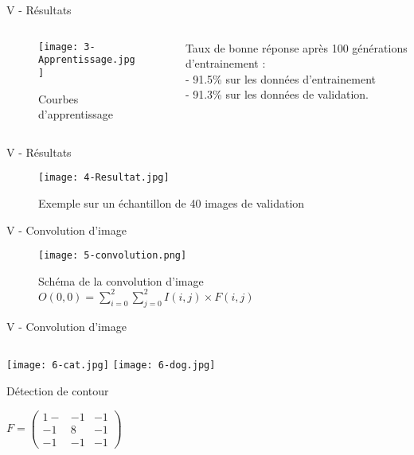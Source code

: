 \begin{frame}{V - Résultats}
	\begin{columns}[T] %
		\begin{column}{.52\textwidth}
			\begin{figure}
				\centering
				\texttt{[image: 3-Apprentissage.jpg]}
				\caption{Courbes d'apprentissage}
			\end{figure}
		\end{column}
		\hfill
		\begin{column}{.50\textwidth}
			\bigskip	\bigskip	\bigskip
			\bigskip	\bigskip	\bigskip
			\bigskip	\bigskip	\bigskip
			Taux de bonne réponse après 100 générations d'entrainement : \\
			- 91.5\% sur les données d'entrainement \\
			- 91.3\% sur les données de validation. \\
		\end{column}%
	\end{columns}
\end{frame}


\begin{frame}{V - Résultats}
	\begin{figure}
		\centering
		\texttt{[image: 4-Resultat.jpg]}
		\caption{Exemple sur un échantillon de 40 images de validation}
	\end{figure}
\end{frame}


\begin{frame}{V - Convolution d'image}
	\begin{figure}
		\centering
		\texttt{[image: 5-convolution.png]}
		\caption{Schéma de la convolution d'image $O(0, 0) = \sum_{i=0}^{2}\sum_{j=0}^{2}I(i, j)\times F(i, j)$}
	\end{figure}
\end{frame}


\begin{frame}{V - Convolution d'image}
	\begin{columns}[T] %
		\begin{column}{.4\textwidth}
			\texttt{[image: 6-cat.jpg]}
			\texttt{[image: 6-dog.jpg]}
			\begin{exampleblock}{Détection de contour}
				\begin{center}
					\centering
					$
					F =
					\begin{pmatrix}
						1- & -1 & -1 \\
						-1 & 8  & -1 \\
						-1 & -1 & -1
					\end{pmatrix}
					$
				\end{center}
			\end{exampleblock}
		\end{column}
		\hfill
		\begin{column}{.58\textwidth}
			
		\end{column}
	\end{columns}
\end{frame}


